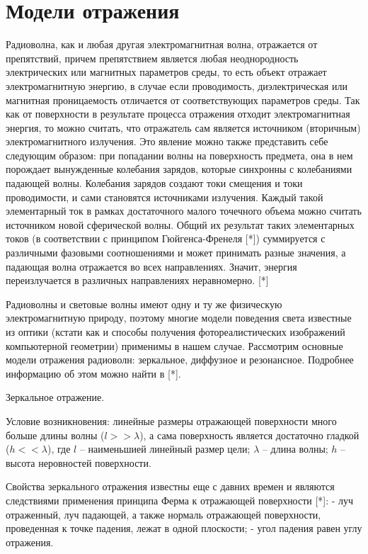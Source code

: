 \section*{Модели отражения} 

Радиоволна, как и любая другая электромагнитная волна, отражается от препятствий, причем препятствием является любая неоднородность электрических или магнитных параметров среды, то есть объект отражает электромагнитную энергию, в случае если проводимость, диэлектрическая или магнитная проницаемость отличается от соответствующих параметров среды.
Так как от поверхности в результате процесса отражения отходит электромагнитная энергия, то можно считать, что отражатель сам является источником (вторичным) электромагнитного излучения. Это явление можно также представить себе следующим образом: при попадании волны на поверхность предмета, она в нем порождает вынужденные колебания зарядов, которые синхронны с колебаниями падающей волны. Колебания зарядов создают токи смещения и токи проводимости, и сами становятся источниками излучения. Каждый такой элементарный ток в рамках достаточного малого точечного объема можно считать источником новой сферической волны. Общий их результат таких элементарных токов (в соответствии с принципом Гюйгенса-Френеля [*]) суммируется с различными фазовыми соотношениями и может принимать разные значения, а падающая волна отражается во всех направлениях. Значит, энергия переизлучается в различных направлениях неравномерно. [*]  

Радиоволны и световые волны имеют одну и ту же физическую электромагнитную природу, поэтому многие модели поведения света известные из оптики (кстати как и способы получения фотореалистических изображений компьютерной геометрии) применимы в нашем случае. Рассмотрим основные модели отражения радиоволн: зеркальное, диффузное и резонансное. Подробнее информацию об этом можно найти в [*].

Зеркальное отражение.

Условие возникновения: линейные размеры отражающей поверхности много больше длины волны ($ l >> \lambda $), а сама поверхность является достаточно гладкой ($ h << \lambda $), где $ l $ -- наименьшией линейный размер цели; $ \lambda $ -- длина волны; $ h $ -- высота неровностей поверхности. 

Свойства зеркального отражения известны еще с давних времен и являются следствиями применения принципа Ферма к отражающей поверхности  [*]:
- луч отраженный, луч падающей, а также нормаль отражающей поверхности, проведенная к точке падения, лежат в одной плоскости;
- угол падения равен углу отражения.

